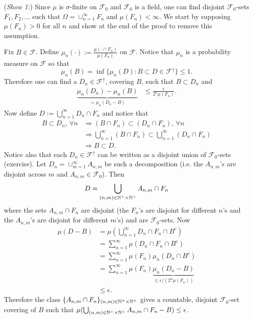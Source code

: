 \begin{exerciseproof}

\textbullet({\sl Show 1:})
Since $\mu$ is $\sigma$-finite on $\mathcal F_0$ and $\mathcal F_0$ is a field, one can find disjoint $\mathcal F_0$-sets $F_1, F_2,\ldots$ such that $\Omega = \cup_{n=1}^\infty F_n$ and $\mu(F_n)<\infty$. We start by supposing $\mu(F_n)>0$ for all $n$ and show at the end of the proof to remove this assumption.


Fix $B\in \mathcal F$.
Define  $ \mu_n(\cdot):= \frac{\mu(\cdot\cap F_n)}{\mu(F_n)} $ on $\mathcal F$. Notice that $\mu_n$ is a probability measure on $\mathcal F$ so that
\[ \mu_n(B)=\inf\{ \mu_n(D): B\subset D \in \mathcal F^{\uparrow}\}\leq 1. \]
Therefore one can find a $D_n\in \mathcal F^{\uparrow}$, covering $B$, such that
$B\subset D_n$ and
\begin{align}
\label{aaa}
\underbrace{\mu_n(D_n)-\mu_n(B)}_{=\mu_n(D_n - B)} &\leq \frac{\epsilon}{2^n \mu(F_n)}.
\end{align}
 Now define  $D :=\bigcup_{n=1}^\infty D_n\cap F_n$
and notice that
\begin{align*}
 B\subset D_n, \,\forall n&\Rightarrow (B\cap F_n) \subset (D_n\cap F_n), \,\forall n \\
 &\Rightarrow \bigcup_{n=1}^\infty  (B\cap  F_n) \subset  \bigcup_{n=1}^\infty (D_n\cap F_n) \\
 &\Rightarrow B\subset D.
 \end{align*}
Notice also that each  $D_n\in\mathcal F^\uparrow$ can be written as a disjoint union of $\mathcal F_0$-sets (exercise). Let $D_n = \cup_{m=1}^\infty A_{n,m}$ be such a decomposition (i.e. the $A_{n,m}$'s are  disjoint across $m$ and $A_{n,m}\in\mathcal F_0$). Then
\[D =  \bigcup_{(n,m)\in \Bbb N^+\times \Bbb N^+}  A_{n,m}\cap F_n\]
where the sets $A_{n,m}\cap F_n$ are disjoint (the $F_n$'s are disjoint for different $n$'s and  the $A_{n,m}$'s are disjoint for different $m$'s) and are $\mathcal F_0$-sets. Now
\begin{align}
\mu(D - B) &= \mu(\bigcup_{n=1}^\infty D_n\cap F_n \cap B^c)\nonumber\\
 &= \sum_{n=1}^\infty \mu(D_n\cap F_n \cap B^c)\nonumber\\
 &=  \sum_{n=1}^\infty \mu(F_n)\mu_n(D_n \cap B^c)\nonumber\\
  &=  \sum_{n=1}^\infty \mu(F_n)\underbrace{\mu_n(D_n - B)}_{\leq \epsilon/(2^n\mu(F_n))}\nonumber\\
 &\leq \epsilon.\label{if}
\end{align}
Therefore the class $\{ A_{n,m}\cap F_n\}_{(n,m)\in \Bbb N^+\times \Bbb N^+ }$ gives a countable, disjoint $\mathcal F_0$-set covering of $B$ such that $\mu(\bigcup_{(n,m)\in \Bbb N^+\times \Bbb N^+}  A_{n,m}\cap F_n - B )\leq \epsilon$.


\end{exerciseproof}
